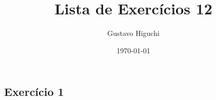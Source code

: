 \documentclass{article}
\title{Lista de Exercícios 12}
\author{Gustavo Higuchi}
\date{\today}
\begin{document}
\maketitle

\tableofcontents
\newpage


\chapter{}
\section{Exercício 1}
\hspace*{15pt}
\end{document}
